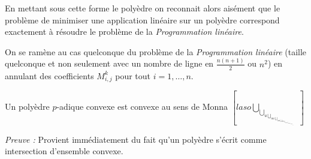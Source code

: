 En mettant sous cette forme le polyèdre on reconnait alors aisément que le problème de minimiser une application linéaire sur un polyèdre correspond exactement à résoudre le problème de la \textit{Programmation linéaire}.

\begin{remarque}
	On se ramène au cas quelconque du problème de la \textit{Programmation linéaire} (taille quelconque et non seulement avec un nombre de ligne en $\frac{n(n+1)}{2}$ ou $n^2$) en annulant des coefficients $M^k_{i,j}$ pour tout $i=1,\ldots,n$.   
\end{remarque}

\begin{propriete}
	Un polyèdre $p$-adique convexe est convexe au sens de Monna $[la so\bigcup_{\bigcup_{u\bigcup_{uu\bigcup_{uu\bigcup_{uu\bigcup_{uuu\bigcup_{uuuu\bigcup_{uuuuu\bigcup_{uurce} } } } } } } } }]$ 
\end{propriete}

\textit{Preuve :} Provient immédiatement du fait qu'un polyèdre s'écrit comme intersection d'ensemble convexe.

